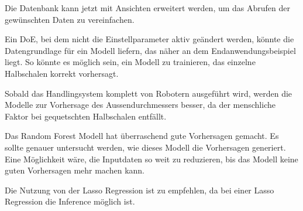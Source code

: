 Die Datenbank kann jetzt mit Ansichten erweitert werden, um das Abrufen der gewünschten Daten zu vereinfachen.

Ein DoE, bei dem nicht die Einstellparameter aktiv geändert werden, könnte die Datengrundlage für ein Modell liefern, das näher an dem Endanwendungsbeispiel liegt. So könnte es möglich sein, ein Modell zu trainieren, das einzelne Halbschalen korrekt vorhersagt.

Sobald das Handlingsystem komplett von Robotern ausgeführt wird, werden die Modelle zur Vorhersage des Aussendurchmessers besser, da der menschliche Faktor bei gequetschten Halbschalen entfällt.

Das Random Forest Modell hat überraschend gute Vorhersagen gemacht. Es sollte genauer untersucht werden, wie dieses Modell die Vorhersagen generiert. Eine Möglichkeit wäre, die Inputdaten so weit zu reduzieren, bis das Modell keine guten Vorhersagen mehr machen kann.

Die Nutzung von der Lasso Regression ist zu empfehlen, da bei einer Lasso Regression die Inference möglich ist.
